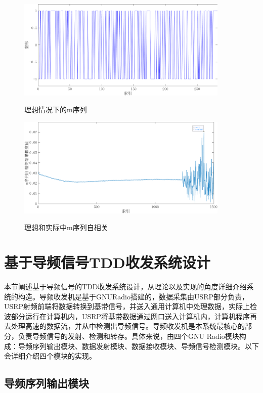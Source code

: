 \documentclass[master]{seuthesis} %
\begin{document}
\begin{Main}
\begin{figure}
    \centering
    \includegraphics[width=0.9\textwidth]{images/m_seq}
    \caption{理想情况下的m序列}{} 
    \label{m_seq}
\end{figure}

\begin{figure}
    \centering
    \includegraphics[width=0.9\textwidth]{images/m_corr_practical}
    \caption{理想和实际中m序列自相关}{} %
    \label{m_corr_practical}
\end{figure}

\section{基于导频信号TDD收发系统设计}

本节阐述基于导频信号的TDD收发系统设计，从理论以及实现的角度详细介绍系统的构造。导频收发机是基于GNURadio搭建的，数据采集由USRP部分负责，USRP射频前端将数据转换到基带信号，并送入通用计算机中处理数据，实际上检波部分运行在计算机内，USRP将基带数据通过网口送入计算机内，计算机程序再去处理高速的数据流，并从中检测出导频信号。导频收发机是本系统最核心的部分，负责导频信号的发射、检测和转存。具体来说，由四个GNU Radio模块构成：导频序列输出模块、数据发射模块、数据接收模块、导频信号检测模块。以下会详细介绍四个模块的实现。

\subsection{导频序列输出模块}


\end{Main}
\end{document}
